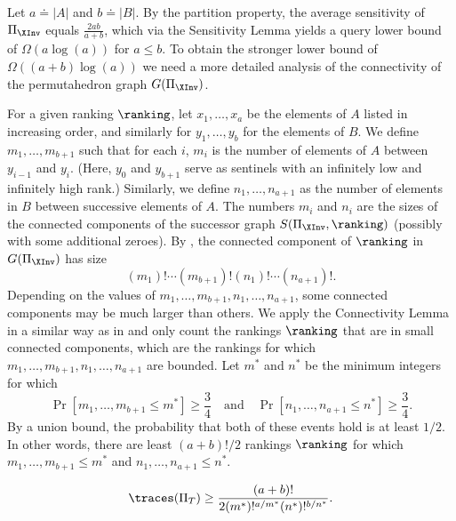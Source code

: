 \documentclass{toc}
\begin{document}
Let $a\doteq |A|$ and $b\doteq |B|$. By the partition property, the average sensitivity of $\Pi_{\XInv}$ equals $\frac{2ab}{a+b}$, which via the Sensitivity Lemma yields a query lower bound of $\Omega(a \log(a))$ for $a \le b$. To obtain the stronger lower bound of $\Omega((a+b)\log(a))$ we need a more detailed analysis of the connectivity of the permutahedron graph $G(\Pi_{\XInv})$. 

For a given ranking $\ranking$, let $x_1,\dots,x_{a}$ be the elements of $A$ listed in increasing order, and similarly for $y_1,\dots,y_b$ for the elements of $B$. We define $m_1,\dots,m_{b+1}$ such that for each $i$, $m_i$ is the number of elements of $A$ between $y_{i-1}$ and $y_i$. (Here, $y_0$ and $y_{b+1}$ serve as sentinels with an infinitely low and infinitely high rank.) Similarly, we define $n_1,\dots,n_{a+1}$ as the number of elements in $B$ between successive elements of $A$. The numbers $m_i$ and $n_i$ are the sizes of the connected components of the successor graph $S(\Pi_{\XInv},\ranking)$ (possibly with some additional zeroes). By , the connected component of $\ranking$ in $G(\Pi_{\XInv})$ has size
\begin{equation}
    \label{eq:mann-whitney:cc-size}
    (m_1)!\cdots (m_{b+1})!(n_1)!\cdots (n_{a+1})!.
\end{equation}
Depending on the values of $m_1,\dots,m_{b+1},n_1,\dots,n_{a+1}$, some connected components may be much larger than others. We apply the Connectivity Lemma in a similar way as in  and only count the rankings $\ranking$ that are in small connected components, which are the rankings for which $m_1,\dots,m_{b+1},n_1,\dots,n_{a+1}$ are bounded. Let $m^*$ and $n^*$ be the minimum integers for which 
\begin{equation*}
    \Pr[m_1,\dots,m_{b+1} \le m^*] \ge \frac{3}{4}\quad\text{and}\quad
    \Pr[n_1,\dots,n_{a+1} \le n^*] \ge \frac{3}{4}.
\end{equation*}
By a union bound, the probability that both of these events hold is at least $1/2$. In other words, there are least $(a+b)!/2$ rankings $\ranking$ for which $m_1,\dots,m_{b+1}\le m^*$ and $n_1,\dots,n_{a+1}\le n^*$.
\begin{proposition}\label{prop:mann-whitney:cc-bound}
    \begin{equation}\label{eq:mann-whitney:cc-bound}
        \traces(\Pi_T) \ge \frac{(a+b)!}{2(m^*)!^{a/m^*}(n^*)!^{b/n^*}}.
    \end{equation}
\end{proposition}
\end{document}

